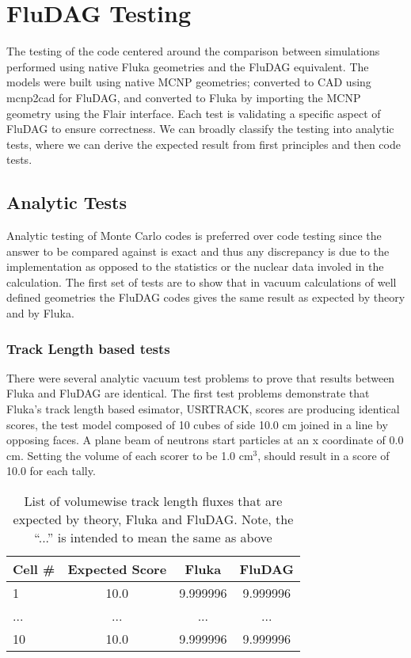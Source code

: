 \documentclass{anstrans}
\begin{document}
\section{FluDAG Testing}
The testing of the code centered around the comparison between
simulations performed using native Fluka geometries and the FluDAG
equivalent. The models were built using native MCNP geometries;
converted to CAD using mcnp2cad for FluDAG, and converted to Fluka by
importing the MCNP geometry using the Flair\cite{flair} interface. Each test
is validating a specific aspect of FluDAG to ensure correctness. We
can broadly classify the testing into analytic tests, where we can
derive the expected result from first principles and then code tests.

\subsection{Analytic Tests}
Analytic testing of Monte Carlo codes is preferred over code testing since the
answer to be compared against is exact and thus any discrepancy is due
to the implementation as opposed to the statistics or the nuclear data
involed in the calculation. The first set of tests are to show that in
vacuum calculations of well defined geometries the FluDAG codes gives
the same result as expected by theory and by Fluka.

\subsubsection*{Track Length based tests}
There were several analytic vacuum test problems to prove that results
between Fluka and FluDAG are identical. The first test problems
demonstrate that Fluka's track length based esimator, USRTRACK, 
scores are producing identical scores, the test model composed of 
10 cubes of side 10.0 cm joined in a line by opposing faces. A plane 
beam of neutrons start particles at an x coordinate of 0.0 cm. Setting 
the volume of each scorer to be 1.0 cm$^3$, should result in a score of 
10.0 for each tally.
\begin{table}[h!]
	\begin{center}
		\begin{tabular}{|l|c|c|c|}
			\hline
			Cell \# & Expected Score & Fluka  & FluDAG \\
			\hline
			1 & 10.0 & 9.999996 & 9.999996 \\
			... & ... & ... & ... \\
			10 & 10.0 & 9.999996 & 9.999996 \\
			\hline
		\end{tabular}
	\caption{List of volumewise track length fluxes that are 
				expected by theory, Fluka and FluDAG. Note, the ``...''
				is intended to mean the same as above}
	\end{center}
	\label{usrtrack}
\end{table}
\end{document}
